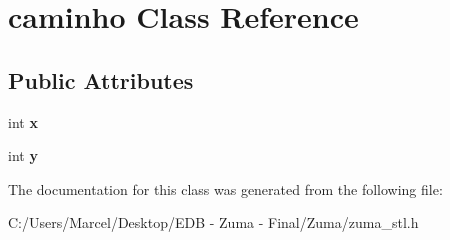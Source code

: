 \hypertarget{classcaminho}{\section{caminho Class Reference}
\label{classcaminho}
}
\subsection*{Public Attributes}
\begin{DoxyCompactItemize}
\item 
\hypertarget{classcaminho_abee59e91b41dd85ee4459b68e54a6396}{int {\bfseries x}}\label{classcaminho_abee59e91b41dd85ee4459b68e54a6396}

\item 
\hypertarget{classcaminho_a5308b6cd86a4fb271639f213386955b8}{int {\bfseries y}}\label{classcaminho_a5308b6cd86a4fb271639f213386955b8}

\end{DoxyCompactItemize}


The documentation for this class was generated from the following file\-:\begin{DoxyCompactItemize}
\item 
C\-:/\-Users/\-Marcel/\-Desktop/\-E\-D\-B -\/ Zuma -\/ Final/\-Zuma/zuma\-\_\-stl.\-h\end{DoxyCompactItemize}
